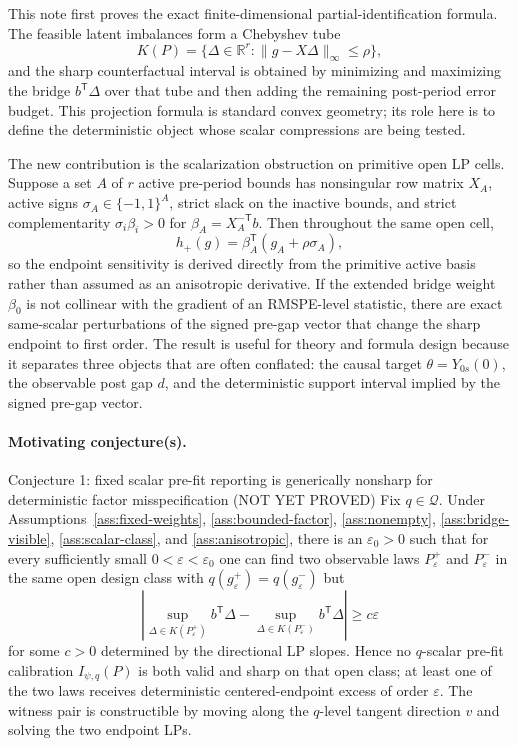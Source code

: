 \documentclass[11pt]{article}
\newcommand{\transpose}{\mathsf{T}}
\newcommand{\R}{\mathbb{R}}
\theoremstyle{definition}
\theoremstyle{plain}
\theoremstyle{remark}
\begin{document}
This note first proves the exact finite-dimensional partial-identification
formula.  The feasible latent imbalances form a Chebyshev tube
\[
K(P)=\{\Delta\in\R^r:\|g-X\Delta\|_\infty\le\rho\},
\]
and the sharp counterfactual interval is obtained by minimizing and maximizing
the bridge \(b^\transpose\Delta\) over that tube and then adding the remaining
post-period error budget.  This projection formula is standard convex geometry;
its role here is to define the deterministic object whose scalar compressions
are being tested.

The new contribution is the scalarization obstruction on primitive open LP
cells.  Suppose a set \(A\) of \(r\) active pre-period bounds has nonsingular
row matrix \(X_A\), active signs \(\sigma_A\in\{-1,1\}^A\), strict slack on the
inactive bounds, and strict complementarity
\(\sigma_i\beta_i>0\) for
\(\beta_A=X_A^{-\transpose}b\).  Then throughout the same open cell,
\[
h_+(g)=\beta_A^\transpose(g_A+\rho\sigma_A),
\]
so the endpoint sensitivity is derived directly from the primitive active
basis rather than assumed as an anisotropic derivative.  If the extended bridge
weight \(\beta_0\) is not collinear with the gradient of an RMSPE-level
statistic, there are exact same-scalar perturbations of the signed pre-gap
vector that change the sharp endpoint to first order.  The result is useful for
theory and formula design because it separates three objects that are often
conflated: the causal target \(\theta=Y_{0s}(0)\), the observable post gap
\(d\), and the deterministic support interval implied by the signed pre-gap
vector.

\paragraph{Motivating conjecture(s).}
Conjecture 1: fixed scalar pre-fit reporting is generically nonsharp for deterministic factor misspecification (NOT YET PROVED)
Fix \(q\in\mathcal Q\). Under Assumptions~\ref{ass:fixed-weights}, \ref{ass:bounded-factor}, \ref{ass:nonempty}, \ref{ass:bridge-visible}, \ref{ass:scalar-class}, and \ref{ass:anisotropic}, there is an \(\varepsilon_0>0\) such that for every sufficiently small \(0<\varepsilon<\varepsilon_0\) one can find two observable laws \(P_\varepsilon^+\) and \(P_\varepsilon^-\) in the same open design class with \(q(g_\varepsilon^+)=q(g_\varepsilon^-)\) but
\[
\left|\sup_{\Delta\in K(P_\varepsilon^+)}b^\transpose\Delta
-\sup_{\Delta\in K(P_\varepsilon^-)}b^\transpose\Delta\right|
\ge c\varepsilon
\]
for some \(c>0\) determined by the directional LP slopes. Hence no \(q\)-scalar pre-fit calibration \(I_{\psi,q}(P)\) is both valid and sharp on that open class; at least one of the two laws receives deterministic centered-endpoint excess of order \(\varepsilon\). The witness pair is constructible by moving along the \(q\)-level tangent direction \(v\) and solving the two endpoint LPs.
\end{document}
